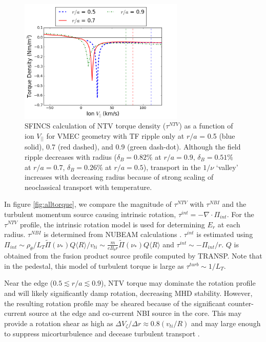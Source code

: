 \documentclass{article}
\begin{document}
\begin{figure}[h!]
\centering
\includegraphics[width=0.7\textwidth]
{Torque_radiusscaling.png}
\caption{\label{fig:Torque_radiusscaling} SFINCS calculation of NTV torque density ($\tau^{NTV}$) as a function of ion $V_{||}$ for VMEC geometry with TF ripple only at $r/a$ = 0.5 (blue solid), 0.7 (red dashed), and 0.9 (green dash-dot). Although the field ripple decreases with radius ($\delta_B = 0.82\%$ at $r/a = 0.9$, $\delta_B = 0.51\%$ at $r/a = 0.7$, $\delta_B = 0.26\%$ at $r/a = 0.5$), transport in the $1/\nu$ `valley' increases with decreasing radius because of strong scaling of neoclassical transport with temperature. }
\end{figure}

In figure \ref{fig:alltorque}, we compare the magnitude of $\tau^{NTV}$ with $\tau^{NBI}$ and the turbulent momentum source causing intrinsic rotation, $\tau^{int} = -\nabla \cdot \Pi_{int}$. For the $\tau^{NTV}$ profile, the intrinsic rotation model is used for determining $E_r$ at each radius. $\tau^{NBI}$ is determined from NUBEAM calculations \cite{Poli2014}. $\tau^{int}$ is estimated using $\Pi_{int} \sim \rho_{\theta}/L_T \widetilde{\Pi}(\nu_*) Q \langle R \rangle/v_{ti} \sim \frac{m}{eB_{\theta}r} \widetilde{\Pi}(\nu_*) Q \langle R \rangle$ and $\tau^{int} \sim -\Pi_{int}/r$. $Q$ is obtained from the fusion product source profile computed by TRANSP. Note that in the pedestal, this model of turbulent torque is large as $\tau^{turb} \sim 1/L_T$. 

Near the edge ($0.5 \lesssim r/a \lesssim 0.9$), NTV torque may dominate the rotation profile and will likely significantly damp rotation, decreasing MHD stability. However, the resulting rotation profile may be sheared because of the significant counter-current source at the edge and co-current NBI source in the core. This may provide a rotation shear as high as $\Delta V_{\zeta}/ \Delta r \approx 0.8 (v_{ti}/R)$ and may large enough to suppress micorturbulence and decease turbulent transport \cite{Hahm1994}. 
\end{document}

